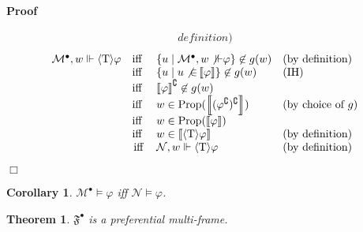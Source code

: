 \documentclass{article}
\newcommand{\nin}{\not\in}
\newcommand{\tmmathbf}[1]{\ensuremath{\boldsymbol{#1}}}
\newcommand{\tmop}[1]{\ensuremath{\operatorname{#1}}}
\newcommand{\tmtextbf}[1]{\text{{\bfseries{#1}}}}
\newenvironment{proof}{\noindent\textbf{Proof\ }}{\hspace*{\fill}$\Box$\medskip}
\newtheorem{corollary}{Corollary}
\newtheorem{theorem}{Theorem}
\newcommand{\Model}{\ensuremath{\mathcal{M}}}
\newcommand{\Net}{\ensuremath{\mathcal{N}}}
\newcommand{\semantics}[1]{\left\llbracket #1 \right\rrbracket}
\newcommand{\diaTyp}{\langle \tmmathbf{\text{T}} \rangle}
\newcommand{\Prop}{\textsf{\tmop{Prop}}}
\begin{document}
\begin{proof}
\begin{description}
\[\begin{array}{lcll}
{         definition)}
       \end{array} \]
    \tmtextbf{$\diaTyp \varphi$ case:}
    \[ \begin{array}{lcll}
         \Model^{\bullet}, w \Vdash \diaTyp \varphi & \text{iff } & \left\{ u
         \mid \Model^{\bullet}, w \not{\Vdash} \varphi \right\} \nin g (w) &
         \text{(by definition)}\\
         & \text{iff } & \left\{ u \mid u \not{\in} \semantics{\varphi}
         \right\} \nin g (w) & \text{(IH)}\\
         & \text{iff } & \semantics{\varphi}^{\complement} \nin g (w) & \\
         & \text{iff } & w \in \Prop
         (\semantics{(\varphi^{\complement})^{\complement}}) & \text{(by
         choice of } g)\\
         & \text{iff } & w \in \Prop (\semantics{\varphi}) & \\
         & \text{iff } & w \in \semantics{\diaTyp \varphi} & \text{(by
         definition)}\\
         & \tmop{iff} & \Net, w \Vdash \diaTyp \varphi & \text{(by
         definition)}
       \end{array} \]
  \end{description}
  
\end{proof}

\begin{corollary}
  $\Model^{\bullet} \models \varphi$ iff $\Net \models \varphi$.
\end{corollary}

\begin{theorem}
  \label{simulation-is-preferential}$\mathfrak{F}^{\bullet}$ is a preferential
  multi-frame.
\end{theorem}
\end{document}
